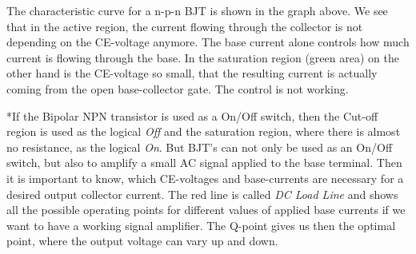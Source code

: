\documentclass[11pt]{article}
\begin{document}
The characteristic curve for a n-p-n BJT is shown in the graph above. We see that in the active region, the current flowing through the collector is not depending on the CE-voltage anymore. The base current alone controls how much current is flowing through the base. In the saturation region (green area) on the other hand is the CE-voltage so small, that the resulting current is actually coming from the open base-collector gate. The control is not working. 


*If the Bipolar NPN transistor is used as a On/Off switch, then the Cut-off region is used as the logical \textit{Off} and the saturation region, where there is almost no resistance, as the logical \textit{On}. But BJT's can not only be used as an On/Off switch, but also to amplify a small AC signal applied to the base terminal. Then it is important to know,  which CE-voltages and base-currents are necessary for a desired output collector current. The red line is called \textit{DC Load Line} and shows all the possible operating points for different values of applied base currents if we want to have a working signal amplifier. The Q-point gives us then the optimal point, where the output voltage can vary up and down. 
\end{document}
